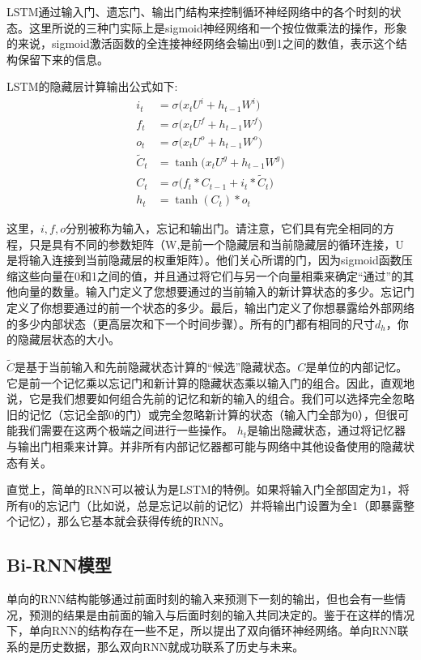 \documentclass[a4paper,AutoFakeBold,oneside,12pt]{book}
\begin{document}
LSTM通过输入门、遗忘门、输出门结构来控制循环神经网络中的各个时刻的状态。这里所说的三种门实际上是sigmoid神经网络和一个按位做乘法的操作，形象的来说，sigmoid激活函数的全连接神经网络会输出0到1之间的数值，表示这个结构保留下来的信息。

LSTM的隐藏层计算输出公式如下:
\begin{equation}
    \begin{aligned}
        i_{t} & =\sigma\big(x_{t}U^{i}+h_{t-1}W^{i}\big) \\
        f_{t} & =\sigma\big(x_{t}U^{f}+h_{t-1}W^{f}\big) \\
        o_{t} & =\sigma\big(x_{t}U^{o}+h_{t-1}W^{o}\big) \\
        \tilde{C}_{t} & =\tanh\big(x_{t}U^{g}+h_{t-1}W^{g}\big) \\
        C_{t} & =\sigma\big(f_{t}\ast C_{t-1}+i_{t}\ast\tilde{C}_{t}\big)\\
        h_{t} & =\tanh(C_{t})\ast o_{t}
    \end{aligned}
\end{equation}


这里，$i, f, o$分别被称为输入，忘记和输出门。请注意，它们具有完全相同的方程，只是具有不同的参数矩阵（W,是前一个隐藏层和当前隐藏层的循环连接，U是将输入连接到当前隐藏层的权重矩阵）。他们关心所谓的门，因为sigmoid函数压缩这些向量在0和1之间的值，并且通过将它们与另一个向量相乘来确定“通过”的其他向量的数量。输入门定义了您想要通过的当前输入的新计算状态的多少。忘记门定义了你想要通过的前一个状态的多少。最后，输出门定义了你想暴露给外部网络的多少内部状态（更高层次和下一个时间步骤）。所有的门都有相同的尺寸$d_h$，你的隐藏层状态的大小。

$\tilde{C}$是基于当前输入和先前隐藏状态计算的“候选”隐藏状态。$C$是单位的内部记忆。它是前一个记忆乘以忘记门和新计算的隐藏状态乘以输入门的组合。因此，直观地说，它是我们想要如何组合先前的记忆和新的输入的组合。我们可以选择完全忽略旧的记忆（忘记全部0的门）或完全忽略新计算的状态（输入门全部为0），但很可能我们需要在这两个极端之间进行一些操作。
$h_t$是输出隐藏状态，通过将记忆器与输出门相乘来计算。并非所有内部记忆器都可能与网络中其他设备使用的隐藏状态有关。

直觉上，简单的RNN可以被认为是LSTM的特例。如果将输入门全部固定为1，将所有0的忘记门（比如说，总是忘记以前的记忆）并将输出门设置为全1（即暴露整个记忆），那么它基本就会获得传统的RNN。


\subsection{Bi-RNN模型}
单向的RNN结构能够通过前面时刻的输入来预测下一刻的输出，但也会有一些情况，预测的结果是由前面的输入与后面时刻的输入共同决定的。鉴于在这样的情况下，单向RNN的结构存在一些不足，所以提出了双向循环神经网络。单向RNN联系的是历史数据，那么双向RNN就成功联系了历史与未来。
\end{document}

